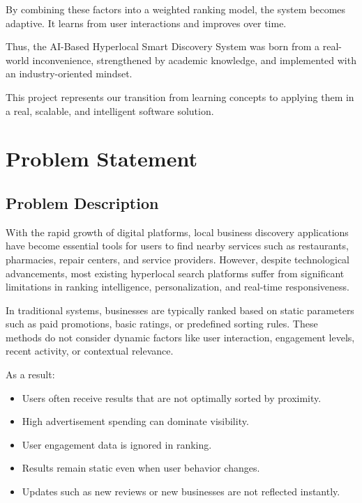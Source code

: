\documentclass[12pt,a4paper]{report}
\begin{document}
By combining these factors into a weighted ranking model, the system becomes adaptive. It learns from user interactions and improves over time.

Thus, the AI-Based Hyperlocal Smart Discovery System was born from a real-world inconvenience, strengthened by academic knowledge, and implemented with an industry-oriented mindset.

This project represents our transition from learning concepts to applying them in a real, scalable, and intelligent software solution.


\chapter{Problem Statement}

\section{Problem Description}

With the rapid growth of digital platforms, local business discovery applications have become essential tools for users to find nearby services such as restaurants, pharmacies, repair centers, and service providers. However, despite technological advancements, most existing hyperlocal search platforms suffer from significant limitations in ranking intelligence, personalization, and real-time responsiveness.

In traditional systems, businesses are typically ranked based on static parameters such as paid promotions, basic ratings, or predefined sorting rules. These methods do not consider dynamic factors like user interaction, engagement levels, recent activity, or contextual relevance.

As a result:

\begin{itemize}

\item Users often receive results that are not optimally sorted by proximity.

\item High advertisement spending can dominate visibility.

\item User engagement data is ignored in ranking.

\item Results remain static even when user behavior changes.

\item Updates such as new reviews or new businesses are not reflected instantly.

\end{itemize}
\end{document}
